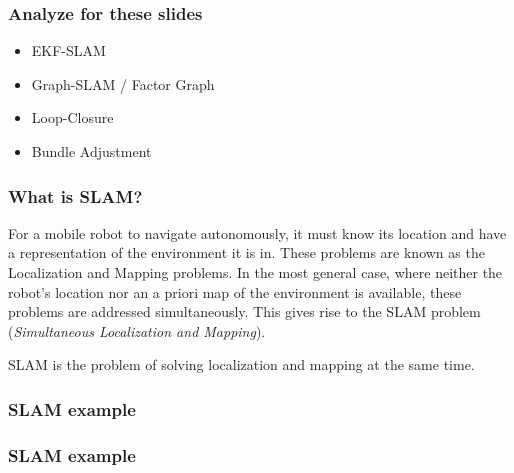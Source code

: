 \begin{frame}
    \frametitle{Analyze for these slides}
    
    \begin{itemize}
    \item EKF-SLAM
    \item Graph-SLAM / Factor Graph
    \item Loop-Closure
    \item Bundle Adjustment
    \end{itemize}
    
    \end{frame}
    
    \begin{frame}
    \frametitle{What is SLAM?}
    
    For a mobile robot to navigate autonomously, it must know its location and have a representation of the environment it is in. These problems are known as the Localization and Mapping problems. In the most general case, where neither the robot's location nor an a priori map of the environment is available, these problems are addressed simultaneously. This gives rise to the SLAM problem (\emph{Simultaneous Localization and Mapping}).
    \begin{block}{}
    SLAM is the problem of solving localization and mapping at the same time.
    \end{block}
    
    \end{frame}
    
    
    \begin{frame}
     \frametitle{SLAM example}
    
     \begin{figure}
     \hfill{}
     \end{figure}
    
    \end{frame}
    
    \begin{frame}
     \frametitle{SLAM example}
     \begin{figure}
     \hfill{}
     \end{figure}
    
    \end{frame}
    
